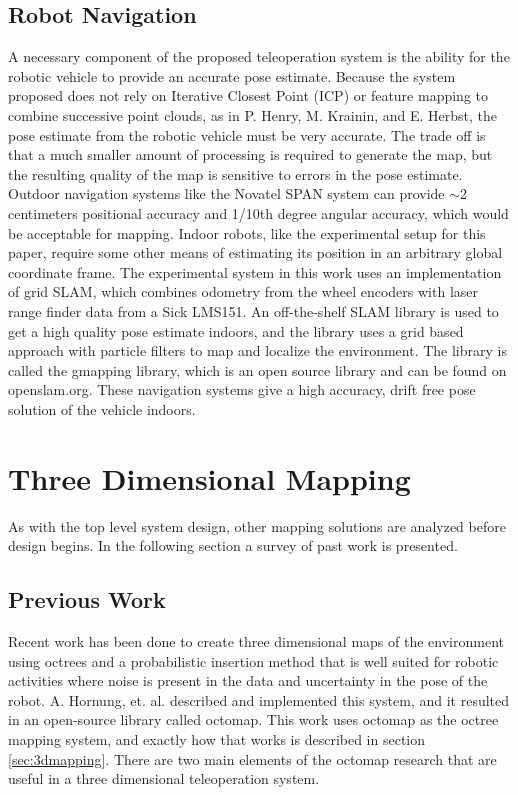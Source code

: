 \documentclass[12pt]{report}
\begin{document}
\section{Robot Navigation}
A necessary component of the proposed teleoperation system is the ability for the robotic vehicle to provide an accurate pose estimate.  Because the system proposed does not rely on Iterative Closest Point (ICP) or feature mapping to combine successive point clouds, as in P. Henry, M. Krainin, and E. Herbst\cite{Henry2010}, the pose estimate from the robotic vehicle must be very accurate.  The trade off is that a much smaller amount of processing is required to generate the map, but the resulting quality of the map is sensitive to errors in the pose estimate.  Outdoor navigation systems like the Novatel SPAN system can provide $\sim$2 centimeters positional accuracy and 1/10th degree angular accuracy\cite{kennedy2006architecture}, which would be acceptable for mapping.  Indoor robots, like the experimental setup for this paper, require some other means of estimating its position in an arbitrary global coordinate frame.  The experimental system in this work uses an implementation of grid SLAM, which combines odometry from the wheel encoders with laser range finder data from a Sick LMS151.  An off-the-shelf SLAM library is used to get a high quality pose estimate indoors, and the library uses a grid based approach with particle filters to map and localize the environment.  The library is called the gmapping library\cite{grisetti2007improved}\cite{grisettiyz2005improving}, which is an open source library and can be found on openslam.org.  These navigation systems give a high accuracy, drift free pose solution of the vehicle indoors.


\chapter{Three Dimensional Mapping}\label{chap:3d_mapping}
As with the top level system design, other mapping solutions are analyzed before design begins.  In the following section a survey of past work is presented.

\section{Previous Work}
\label{sec:previouswork_3dmapping}
Recent work has been done to create three dimensional maps of the environment using octrees and a probabilistic insertion method that is well suited for robotic activities where noise is present in the data and uncertainty in the pose of the robot. A. Hornung, et. al. described and implemented this system, and it resulted in an open-source library called octomap.\cite{octomap} This work uses octomap as the octree mapping system, and exactly how that works is described in section \ref{sec:3dmapping}.  There are two main elements of the octomap research that are useful in a three dimensional teleoperation system.
\end{document}
